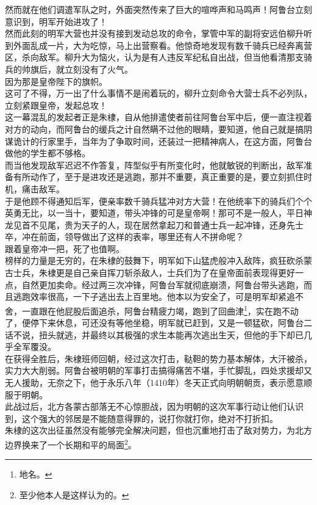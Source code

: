 \begin{multicols}{\theparacolNo}
然而就在他们调遣军队之时，外面突然传来了巨大的喧哗声和马鸣声！阿鲁台立刻意识到，明军开始进攻了！\\

然而此刻的明军大营也并没有接到发动总攻的命令，掌管中军的副将安远伯柳升听到外面乱成一片，大为吃惊，马上出营察看。他惊奇地发现有数千骑兵已经奔离营区，杀向敌军。柳升大为恼火，认为是有人违反军纪私自出战，但当他看清那支骑兵的帅旗后，就立刻没有了火气。\\

因为那是皇帝陛下的旗帜。\\

这可了不得，万一出了什么事情不是闹着玩的，柳升立刻命令大营士兵不必列队，立刻紧跟皇帝，发起总攻！\\

这一幕混乱的发起者正是朱棣，自从他排遣使者前往阿鲁台军中后，便一直注视着对方的动向，而阿鲁台的缓兵之计自然瞒不过他的眼睛，要知道，他自己就是搞阴谋诡计的行家里手，当年为了争取时间，还装过一把精神病人，在这方面，阿鲁台做他的学生都不够格。\\

而当他发现敌军迟迟不作答复，阵型似乎有所变化时，他就敏锐的判断出，敌军准备有所动作了，至于是进攻还是逃跑，那并不重要，真正重要的是，要立刻抓住时机，痛击敌军。\\

于是他顾不得通知后军，便亲率数千骑兵猛冲对方大营！在他统率下的骑兵们个个英勇无比，以一当十，要知道，带头冲锋的可是皇帝啊！那可不是一般人，平日神龙见首不见尾，贵为天子的人，现在居然拿起刀和普通士兵一起冲锋，还身先士卒，冲在前面，领导做出了这样的表率，哪里还有人不拼命呢？\\

跟着皇帝冲一把，死了也值啊。\\

榜样的力量是无穷的，在朱棣的鼓舞下，明军如下山猛虎般冲入敌阵，疯狂砍杀蒙古士兵，朱棣更是自己亲自挥刀斩杀敌人，士兵们为了在皇帝面前表现得更好一点，自然更加卖命。经过两三次冲锋，阿鲁台军就彻底崩溃，阿鲁台带头逃跑，而且逃跑效率很高，一下子逃出去上百里地。他本以为安全了，可是明军却紧追不舍，一直跟在他屁股后面追杀，阿鲁台精疲力竭，跑到了回曲津\footnote{地名。}，实在跑不动了，便停下来休息，可还没有等他坐稳，明军就已赶到，又是一顿猛砍，阿鲁台二话不说，扭头就逃，并最终以其极强的求生本能再次逃出生天，但他的手下却已几乎全军覆没。\\

在获得全胜后，朱棣班师回朝，经过这次打击，鞑靼的势力基本解体，大汗被杀，实力大大削弱。阿鲁台被明朝的军事打击搞得痛苦不堪，手忙脚乱，四处求援却又无人援助，无奈之下，他于永乐八年（1410年）冬天正式向明朝朝贡，表示愿意顺服于明朝。\\

此战过后，北方各蒙古部落无不心惊胆战，因为明朝的这次军事行动让他们认识到，这个强大的邻居是不能随意得罪的，说打你就打你，绝对不打折扣。\\

朱棣的这次出征虽然没有能够完全解决问题，但也沉重地打击了敌对势力，为北方边界换来了一个长期和平的局面\footnote{至少他本人是这样认为的。}。\\
\ifnum{}
	\end{multicols}
\fi
\newpage
